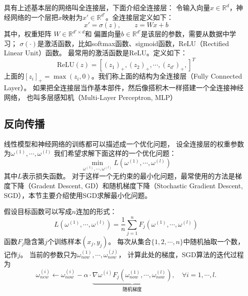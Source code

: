 \documentclass[AutoFakeBold]{LZUThesis}
\begin{document}
具有上述基本层的网络叫全连接层，下面介绍全连接层\cite{noauthor__2024}：
令输入向量$x \in \mathbb{R}^d$，神经网络的一个层把$x$映射为$x' \in \mathbb{R}^{d'}$。全连接层定义如下：
\begin{equation}
  x' = \sigma(z), \qquad z = W x + b
\end{equation}
其中，权重矩阵 $W \in \mathbb{R}^{d' \times d}$和
偏置向量$b \in \mathbb{R}^{d'}$是该层的参数，需要从数据中学习；
$\sigma(\cdot)$是激活函数，比如softmax函数、sigmoid函数，ReLU（Rectified Linear Unit）函数。
最常用的激活函数是ReLU。定义如下：
\begin{equation}
  \mathrm{ReLU}(z) = [(z_1)_+, (z_2)_+, \cdots, (z_{d'})_+,]^T
\end{equation}
上面的$[z_i]_+ = \max(z_i, 0)$。我们称上面的结构为全连接层（Fully Connected Layer）。
如果把全连接层当作基本部件，然后像搭积木一样搭建一个全连接神经网络，
也叫多层感知机（Multi-Layer Perceptron, MLP）

\subsection{反向传播}
线性模型和神经网络的训练都可以描述成一个优化问题，
设全连接层的权重参数为$\omega^{(1)}, \cdots, \omega^{(l)}$
我们希望求解下面这样的一个优化问题\cite{noauthor__2024}：
\begin{equation}
  \min_{\omega^{(1)}, \cdots, \omega^{(l)}} L(\omega^{(1)}, \cdots, \omega^{(l)})
\end{equation}
其中$L$表示损失函数。
对于这样一个无约束的最小化问题，最常使用的方法是梯度下降（Gradent Descent, GD）和随机梯度下降（Stochastic Gradient Descent, SGD），本节主要介绍使用SGD求解最小化问题。

假设目标函数可以写成$n$连加的形式：
\begin{equation}
  L(\omega^{(1)}, \cdots, \omega^{(l)}) = \frac1n \sum_{j = 1}^{n}
  F_j (\omega^{(1)}, \cdots, \omega^{(l)})
\end{equation}
函数$F_j$隐含第$j$个训练样本$(x_j, y_j)$。
每次从集合$\{ 1,2,\cdots,n \}$中随机抽取一个数，记作$j$。
当前的参数只为$\omega_{now}^{(1)}, \cdots, \omega_{now}^{(j)}$，
计算此处的梯度，SGD算法的迭代过程为
\begin{equation}
  \omega_{new}^{(i)} \leftarrow \omega_{now}^{(i)} - 
  \alpha \cdot \underbrace{
  \nabla{\omega^{(i)}} F_j \left( \omega_{now}^{(1)}, 
\cdots, \omega_{now}^{(l)} \right)}_\text{随机梯度},
  \quad \forall i = 1, \cdots, l.
\end{equation}
\end{document}

